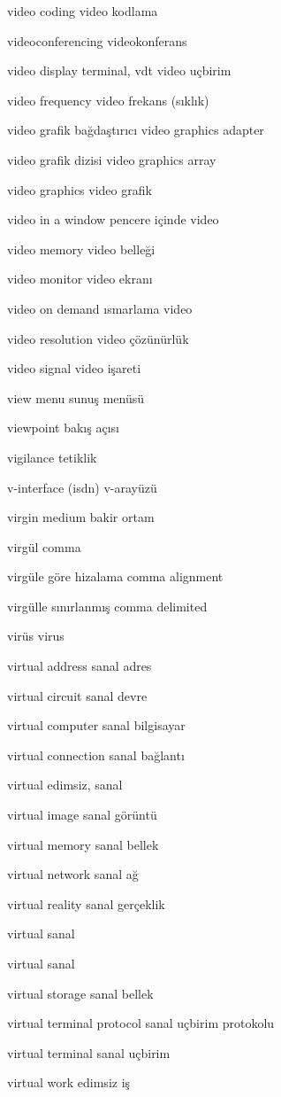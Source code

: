 \documentclass[12pt,fleqn]{article}\usepackage{../../common}
\begin{document}
video coding video kodlama

videoconferencing videokonferans

video display terminal, vdt video uçbirim

video frequency video frekans (sıklık)

video grafik bağdaştırıcı video graphics adapter

video grafik dizisi video graphics array

video graphics video grafik

video in a window pencere içinde video

video memory video belleği

video monitor video ekranı

video on demand ısmarlama video

video resolution video çözünürlük

video signal video işareti

view menu sunuş menüsü

viewpoint bakış açısı

vigilance tetiklik

v-interface (isdn) v-arayüzü

virgin medium bakir ortam

virgül comma

virgüle göre hizalama comma alignment

virgülle sınırlanmış comma delimited

virüs virus

virtual address sanal adres

virtual circuit sanal devre

virtual computer sanal bilgisayar

virtual connection sanal bağlantı

virtual edimsiz, sanal

virtual image sanal görüntü

virtual memory sanal bellek

virtual network sanal ağ

virtual reality sanal gerçeklik

virtual sanal

virtual sanal

virtual storage sanal bellek

virtual terminal protocol sanal uçbirim protokolu

virtual terminal sanal uçbirim

virtual work edimsiz iş
\end{document}
